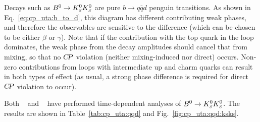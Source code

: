Decays such as $B^0\to K^0_{\scriptscriptstyle S}K^0_{\scriptscriptstyle S}$ are pure $b \to q\bar{q}d$ penguin transitions.
As shown in Eq.~\ref{eq:cp_uta:b_to_d},
this diagram has different contributing weak phases,
and therefore the observables are sensitive to the difference 
(which can be chosen to be either $\beta$ or $\gamma$).
Note that if the contribution with the top quark in the loop dominates,
the weak phase from the decay amplitudes should cancel that from mixing,
so that no $C\!P$ violation (neither mixing-induced nor direct) occurs.
Non-zero contributions from loops with intermediate up and charm quarks
can result in both types of effect 
(as usual, a strong phase difference is required for direct $C\!P$ violation
to occur).

Both \babar~\cite{Aubert:2006gm} and \belle~\cite{Nakahama:2007dg}
have performed time-dependent analyses of $B^0\to K^0_{\scriptscriptstyle S}K^0_{\scriptscriptstyle S}$.
The results are shown in Table~\ref{tab:cp_uta:qqd}
and Fig.~\ref{fig:cp_uta:qqd:ksks}.




